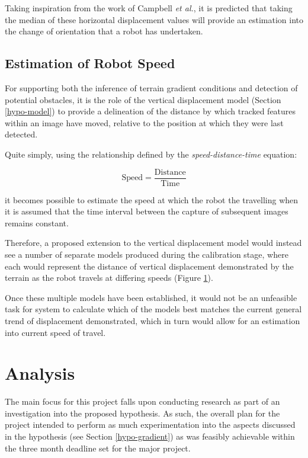 Taking inspiration from the work of Campbell \textit{et al.}, it is predicted that taking the median of these horizontal displacement values will provide an estimation into the change of orientation that a robot has undertaken.

\subsection{Estimation of Robot Speed}

For supporting both the inference of terrain gradient conditions and detection of potential obstacles, it is the role of the vertical displacement model (Section \ref{hypo-model})  to provide a delineation of the distance by which tracked features within an image have moved, relative to the position at which they were last detected. 

Quite simply, using the relationship defined by the \textit{speed-distance-time} equation:

$$\text{Speed} = \frac{\text{Distance}}{\text{Time}}$$ 

it becomes possible to estimate the speed at which the robot the travelling when it is assumed that the time interval between the capture of subsequent images remains constant.

Therefore, a proposed extension to the vertical displacement model would instead see a number of separate models produced during the calibration stage, where each would represent the distance of vertical displacement demonstrated by the terrain as the robot travels at differing speeds (Figure \ref{}).

Once these multiple models have been established, it would not be an unfeasible task for system to calculate which of the models best matches the current general trend of displacement demonstrated, which in turn would allow for an estimation into current speed of travel.

\section{Analysis}

The main focus for this project falls upon conducting research as part of an investigation into the proposed hypothesis. As such, the overall plan for the project intended to perform as much experimentation into the aspects discussed in the hypothesis (see Section \ref{hypo-gradient}) as was feasibly achievable within the three month deadline set for the major project.

